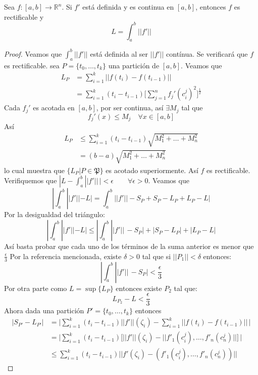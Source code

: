 \begin{proposition}
  Sea $f: [a,b] \to \mathbb{R}^n$. Si $f'$ está definida y es continua en
  $[a,b]$, entonces $f$ es rectificable y 
  \[
    L = \int_a^b ||f'||
  \]
\end{proposition}
\begin{proof}
  Veamos que $\int_a^b ||f'||$ está definida al ser $||f'||$ contínua. 
  Se verificará que $f$ es rectificable. sea $P= \{t_0, \ldots, t_k \}$ una
  partición de $[a,b]$.
  Veamos que 
  \begin{align*}
    L_P &= \sum_{i=1}^k ||f(t_i)- f(t_{i-1})|| \\
        &= \sum_{i=1}^k (t_i - t_{i-1})\big[\sum_{j=1}^n f_j'(c_i^j)^2 \big]^{\frac{1}{2}}
  \end{align*}
  Cada $f_j'$ es acotada en $[a,b]$, por ser continua, así $\exists M_j$ tal que 
  \[
    f_j'(x) \leq M_j \quad \forall x \in [a,b] 
  \]
  Así
  \begin{align*}
    L_P &\leq \sum_{i=1}^k(t_i-t_{i-1})\sqrt{M_1^2 + \ldots + M_n^2}  \\
        &= (b-a) \sqrt{M_1^2 + \ldots + M_n^2}
  \end{align*}
  lo cual muestra que $\{L_P | P \in \mathfrak{P} \}$ es acotado superiormente.
  Así $f$ es rectificable.
  Verifiquemos que $|L - \int_a^b ||f'||\,| < \epsilon \quad \quad \forall \epsilon>0
  $.
  Veamos que 
  \[
    |\int_a^b ||f'|| - L| = \int_a^b ||f'|| - S_P + S_P - L_P + L_P -
    L|
  \]
  Por la desigualdad del triángulo:
  \[
    |\int_a^b ||f'|| - L| \leq |\int_a^b ||f'||\, - S_P| + |S_P - L_P| + |L_P -
    L|
  \]
  Así basta probar que cada uno de los términos de la suma anterior es menor que
  $\frac{\epsilon}{3}$
  Por la referencia mencionada, existe $\delta > 0$ tal que  si $||P_1|| < \delta$
  entonces:
  \[
    |\int_a^b ||f'||\, - S_P| < \frac{\epsilon}{3}
  \]
  Por otra parte como $L = \sup\{L_P\}$ entonces existe $P_2$ tal que:
  \[
    L_{P_2} -L < \frac{\epsilon}{3}
  \]
  Ahora dada una partición $P' = \{t_0, \ldots, t_k\}$ entonces
  \begin{align*}
    |S_{P'} - L_{P'} | &= \big| \sum_{i=1}^k(t_i - t_{i-1}) ||f'||(\zeta_i) -
    \sum_{i=1}^k||f(t_i) - f(t_{i-1})||\,\big|  \\
                       &= \big|\sum_{i=1}^k(t_i- t_{i-1})\big[ ||f'||(\zeta_i) -
                       ||f'_1(c_i^j), \ldots, f'_n(c_n^j)||\big]\,\big|\\
                       &\leq \sum_{i=1}^k(t_i- t_{i-1}) ||f'(\zeta_i) -
                       (f'_1(c_i^j), \ldots, f'_n(c_n^j))||

\end{align*}
\end{proof}
